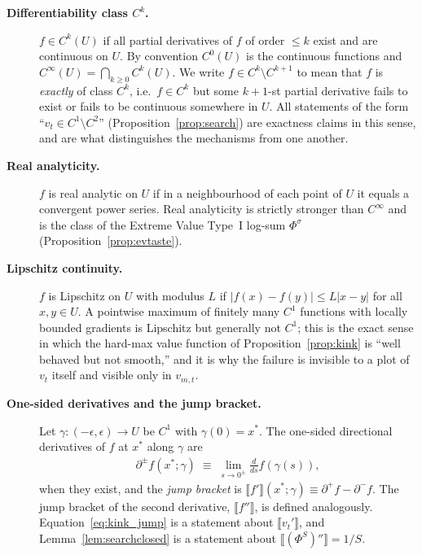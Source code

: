 \begin{description}

\item[\textnormal{\textbf{Differentiability class $C^{k}$.}}]
$f\in C^{k}(U)$ if all partial derivatives of $f$ of order $\le k$ exist and are
continuous on $U$. By convention $C^{0}(U)$ is the continuous functions and
$C^{\infty}(U)=\bigcap_{k\ge0}C^{k}(U)$. We write $f\in C^{k}\setminus C^{k+1}$ to mean
that $f$ is \emph{exactly} of class $C^{k}$, i.e.\ $f\in C^{k}$ but some $k+1$-st partial
derivative fails to exist or fails to be continuous somewhere in $U$. All statements of
the form ``$v_t\in C^{1}\setminus C^{2}$'' (Proposition~\ref{prop:search}) are exactness
claims in this sense, and are what distinguishes the mechanisms from one another.

\item[\textnormal{\textbf{Real analyticity.}}]
$f$ is real analytic on $U$ if in a neighbourhood of each point of $U$ it equals a
convergent power series. Real analyticity is strictly stronger than $C^{\infty}$ and is
the class of the Extreme Value Type~I log-sum $\Phi^{\sigma}$
(Proposition~\ref{prop:evtaste}).

\item[\textnormal{\textbf{Lipschitz continuity.}}]
$f$ is Lipschitz on $U$ with modulus $L$ if $\lvert f(x)-f(y)\rvert\le L\lvert x-y\rvert$
for all $x,y\in U$. A pointwise maximum of finitely many $C^{1}$ functions with locally
bounded gradients is Lipschitz but generally not $C^{1}$; this is the exact sense in
which the hard-max value function of Proposition~\ref{prop:kink} is ``well behaved but
not smooth,'' and it is why the failure is invisible to a plot of $v_t$ itself and
visible only in $v_{m,t}$.

\item[\textnormal{\textbf{One-sided derivatives and the jump bracket.}}]
Let $\gamma:(-\epsilon,\epsilon)\to U$ be $C^{1}$ with $\gamma(0)=x^{\ast}$. The one-sided
directional derivatives of $f$ at $x^{\ast}$ along $\gamma$ are
\begin{align}
\partial^{\pm}f(x^{\ast};\gamma) \;\equiv\; \lim_{s\to 0^{\pm}}\frac{d}{ds}f(\gamma(s)),
\end{align}
when they exist, and the \emph{jump bracket} is
$\llbracket f'\rrbracket(x^{\ast};\gamma)\equiv\partial^{+}f-\partial^{-}f$. The jump
bracket of the second derivative, $\llbracket f''\rrbracket$, is defined analogously.
Equation~\eqref{eq:kink_jump} is a statement about $\llbracket v_t'\rrbracket$, and
Lemma~\ref{lem:searchclosed} is a statement about $\llbracket (\Phi^{S})''\rrbracket=1/S$.


\end{description}
